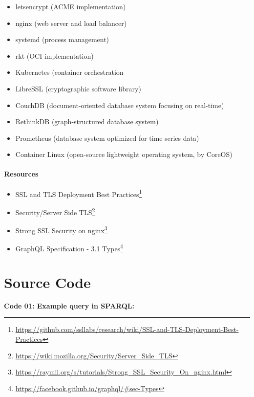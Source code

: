 \documentclass[12pt,english,a4paper,titlepage,cleardoublepage=empty,dottedtoc]{report}
\renewcommand{\href}[2]{#2\footnote{\url{#1}}}
\providecommand{\tightlist}{%
  \setlength{\itemsep}{0pt}\setlength{\parskip}{0pt}}
\begin{document}
\begin{itemize}
\tightlist
\item
  letsencrypt (ACME implementation)
\item
  nginx (web server and load balancer)
\item
  systemd (process management)
\item
  rkt (OCI implementation)
\item
  Kubernetes (container orchestration
\item
  LibreSSL (cryptographic software library)
\item
  CouchDB (document-oriented database system focusing on real-time)
\item
  RethinkDB (graph-structured database system)
\item
  Prometheus (database system optimized for time series data)
\item
  Container Linux (open-source lightweight operating system, by CoreOS)
\end{itemize}

\subsubsection*{Resources}\label{resources}

\begin{itemize}
\tightlist
\item
  \href{https://github.com/ssllabs/research/wiki/SSL-and-TLS-Deployment-Best-Practices}{SSL
  and TLS Deployment Best Practices}
\item
  \href{https://wiki.mozilla.org/Security/Server_Side_TLS}{Security/Server
  Side TLS}
\item
  \href{https://raymii.org/s/tutorials/Strong_SSL_Security_On_nginx.html}{Strong
  SSL Security on nginx}
\item
  \href{https://facebook.github.io/graphql/\#sec-Types}{GraphQL
  Specification - 3.1 Types}
\end{itemize}

\chapter*{Source Code}\label{source-code}

\textbf{\protect\hypertarget{code-01_sparql-query}{}{Code 01: Example
query in SPARQL}:}
\end{document}
